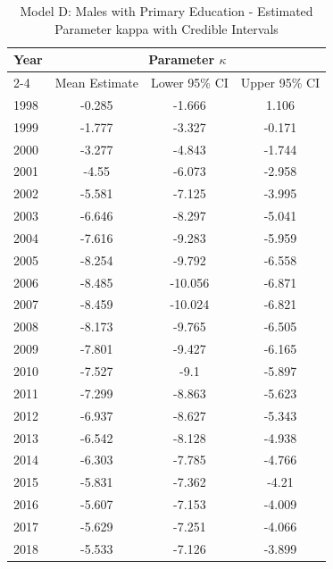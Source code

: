 \begin{landscape}
\begin{table}[htbp]
\centering
\caption{Model D: Males with Primary Education - Estimated Parameter kappa  with Credible Intervals}
\label{tab:parameters_k30}
\begin{tabular}{@{}lccc@{}}
\toprule
Year & \multicolumn{3}{c}{Parameter \(\kappa\)} \\
\cmidrule(lr){2-4}
      & Mean Estimate & Lower 95\% CI & Upper 95\% CI \\
\midrule
1998 & -0.285 & -1.666 & 1.106 \\
1999 & -1.777 & -3.327 & -0.171 \\
2000 & -3.277 & -4.843 & -1.744 \\
2001 & -4.55 & -6.073 & -2.958 \\
2002 & -5.581 & -7.125 & -3.995 \\
2003 & -6.646 & -8.297 & -5.041 \\
2004 & -7.616 & -9.283 & -5.959 \\
2005 & -8.254 & -9.792 & -6.558 \\
2006 & -8.485 & -10.056 & -6.871 \\
2007 & -8.459 & -10.024 & -6.821 \\
2008 & -8.173 & -9.765 & -6.505 \\
2009 & -7.801 & -9.427 & -6.165 \\
2010 & -7.527 & -9.1 & -5.897 \\
2011 & -7.299 & -8.863 & -5.623 \\
2012 & -6.937 & -8.627 & -5.343 \\
2013 & -6.542 & -8.128 & -4.938 \\
2014 & -6.303 & -7.785 & -4.766 \\
2015 & -5.831 & -7.362 & -4.21 \\
2016 & -5.607 & -7.153 & -4.009 \\
2017 & -5.629 & -7.251 & -4.066 \\
2018 & -5.533 & -7.126 & -3.899 \\
\bottomrule
\end{tabular}
\end{table}
\end{landscape}